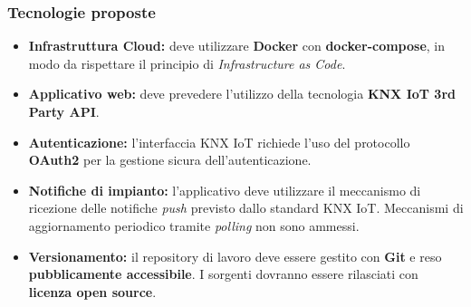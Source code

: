 \documentclass[a4paper,11pt]{article}
\begin{document}
\subsubsection{Tecnologie proposte}
\begin{itemize}
 \item \textbf{Infrastruttura Cloud:} deve utilizzare \textbf{Docker} con \textbf{docker-compose}, in modo da rispettare il principio di \textit{Infrastructure as Code}.
 \item \textbf{Applicativo web:} deve prevedere l'utilizzo della tecnologia \textbf{KNX IoT 3rd Party API}.
 \item \textbf{Autenticazione:} l'interfaccia KNX IoT richiede l'uso del protocollo \textbf{OAuth2} per la gestione sicura dell'autenticazione.
 \item \textbf{Notifiche di impianto:} l'applicativo deve utilizzare il meccanismo di ricezione delle notifiche \textit{push} previsto dallo standard KNX IoT. 
 Meccanismi di aggiornamento periodico tramite \textit{polling} non sono ammessi.
 \item \textbf{Versionamento:} il repository di lavoro deve essere gestito con \textbf{Git} e reso \textbf{pubblicamente accessibile}. 
 I sorgenti dovranno essere rilasciati con \textbf{licenza open source}.
\end{itemize}
\end{document}
